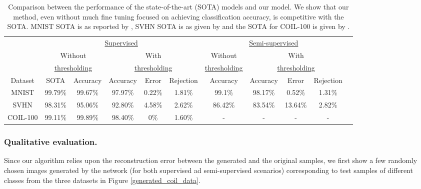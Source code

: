 \documentclass[letterpaper]{article} %
\begin{document}
\begin{center}
\begin{table}[t!]
  \centering
  \begin{tabular}{cccc c c c c c c c}
      \hline
     &  \multicolumn{5}{c}{\underline{\qquad \qquad \quad \qquad Supervised\qquad \qquad \qquad}\qquad \quad} & \multicolumn{4}{c}{\underline{\qquad \qquad \quad Semi-supervised \quad\qquad \qquad}\qquad \qquad \qquad}\rule{0pt}{2.6ex}\\
      \vspace{-.15cm}
      & \multicolumn{2}{c}{Without} & \multicolumn{3}{c}{With} & \multicolumn{1}{c}{Without} & \multicolumn{3}{c}{With} \rule{0pt}{2.6ex}\\
      & \multicolumn{2}{c}{\underline{\quad thresholding\quad}} & \multicolumn{3}{c}{\underline{\qquad\qquad thresholding \qquad\quad}} & \multicolumn{1}{c}{\underline{thresholding}} & \multicolumn{3}{c}{\underline{\qquad\quad\quad thresholding\quad\qquad\qquad}} \rule{0pt}{2.6ex}\\
\vspace{.1cm}
      Dataset & SOTA & Accuracy & Accuracy & Error & Rejection & Accuracy & Accuracy & Error & Rejection\rule{0pt}{2.6ex}\\
      MNIST & 99.79\% & 99.67\% & 97.97\% & 0.22\%  & 1.81\% & 99.1\% & 98.17\% & 0.52\% & 1.31\%\\
      SVHN & 98.31\% & 95.06\% & 92.80\% & 4.58\% & 2.62\%  & 86.42\% & 83.54\% & 13.64\% & 2.82\%\\
      COIL-100 & 99.11\% & 99.89\% & 98.40\% & 0\% & 1.60\% & - & - & - & -\\
      \hline
  \end{tabular}
  \caption{Comparison between the performance of the state-of-the-art (SOTA) models and our model. We show that our method, even without much fine tuning focused on achieving classification accuracy, is competitive with the SOTA. MNIST SOTA is as reported by , SVHN SOTA is as given by  and the SOTA for COIL-100 is given by .}
  \label{Comp_normal_classifier}
\end{table}
\end{center}

\subsubsection{Qualitative evaluation.}
Since our algorithm relies upon the reconstruction error between the generated and the original samples, we first show a few randomly chosen images generated by the network (for both supervised ad semi-supervised scenarios) corresponding to test samples of different classes from the three datasets in Figure \ref{generated_coil_data}.
\end{document}
